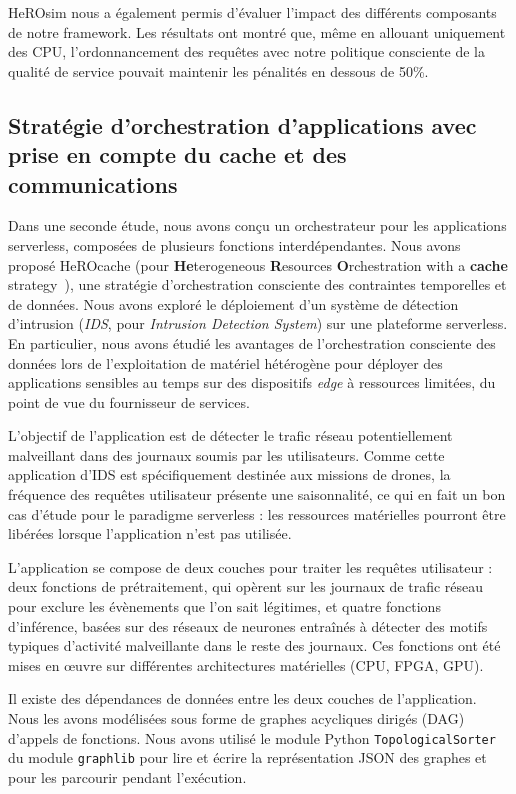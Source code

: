 HeROsim nous a également permis d'évaluer l'impact des différents composants de notre framework. Les résultats ont montré que, même en allouant uniquement des CPU, l'ordonnancement des requêtes avec notre politique consciente de la qualité de service pouvait maintenir les pénalités en dessous de 50\%.

\subsection{Stratégie d'orchestration d'applications avec prise en compte du cache et des communications}

Dans une seconde étude, nous avons conçu un orchestrateur pour les applications serverless, composées de plusieurs fonctions interdépendantes. Nous avons proposé HeROcache (pour \textbf{He}terogeneous \textbf{R}esources \textbf{O}rchestration with a \textbf{cache} strategy~\cite{herocache}), une stratégie d'orchestration consciente des contraintes temporelles et de données. Nous avons exploré le déploiement d'un système de détection d'intrusion (\textit{IDS}, pour \textit{Intrusion Detection System}) sur une plateforme serverless. En particulier, nous avons étudié les avantages de l'orchestration consciente des données lors de l'exploitation de matériel hétérogène pour déployer des applications sensibles au temps sur des dispositifs \textit{edge} à ressources limitées, du point de vue du fournisseur de services.

L'objectif de l'application est de détecter le trafic réseau potentiellement malveillant dans des journaux soumis par les utilisateurs. Comme cette application d'IDS est spécifiquement destinée aux missions de drones, la fréquence des requêtes utilisateur présente une saisonnalité, ce qui en fait un bon cas d'étude pour le paradigme serverless : les ressources matérielles pourront être libérées lorsque l'application n'est pas utilisée.

L'application se compose de deux couches pour traiter les requêtes utilisateur : deux fonctions de prétraitement, qui opèrent sur les journaux de trafic réseau pour exclure les évènements que l'on sait légitimes, et quatre fonctions d'inférence, basées sur des réseaux de neurones entraînés à détecter des motifs typiques d'activité malveillante dans le reste des journaux. Ces fonctions ont été mises en œuvre sur différentes architectures matérielles (CPU, FPGA, GPU).

Il existe des dépendances de données entre les deux couches de l'application. Nous les avons modélisées sous forme de graphes acycliques dirigés (DAG) d'appels de fonctions. Nous avons utilisé le module Python \texttt{TopologicalSorter} du module \texttt{graphlib} pour lire et écrire la représentation JSON des graphes et pour les parcourir pendant l'exécution.

